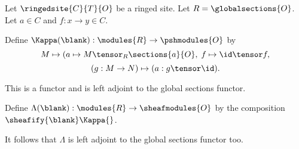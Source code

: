 Let $\ringedsite{C}{T}{O}$ be a ringed site.
Let $R=\globalsections{O}$. Let $a\in C$ and $f:x\rightarrow y \in C$.

Define $\Kappa(\blank): \modules{R} \rightarrow \pshmodules{O}$ by
\[M \mapsto (a \mapsto M \tensor_R \sections{a}{O} ,\; f \mapsto \id \tensor f ,\]
\[(g: M \rightarrow N) \mapsto (a: g \tensor \id )  .\]

This is a functor and is left adjoint to the global sections functor.

Define $\Lambda(\blank):\modules{R} \rightarrow \sheafmodules{O}$ by the composition
$\sheafify{\blank} \Kappa{}$.

It follows that $\Lambda$ is left adjoint to the global sections functor too.